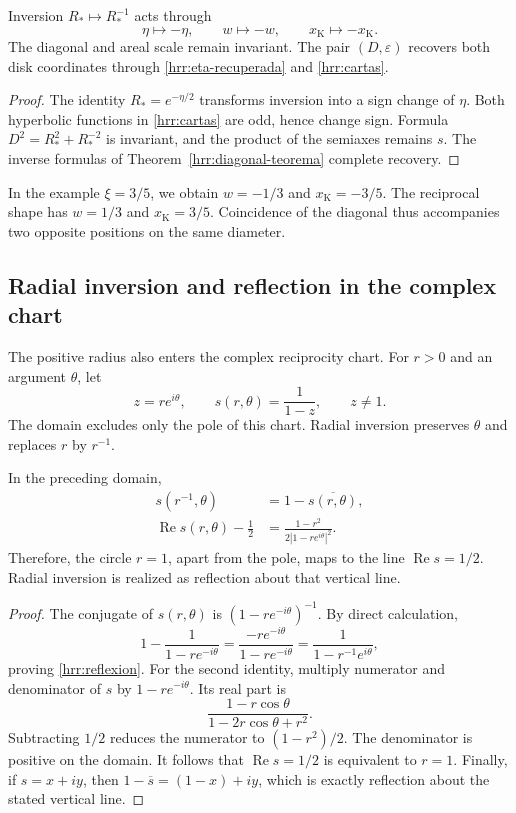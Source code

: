 \begin{proposition}
\label{hrr:reciprocidad-cartas} Inversion \(R_*\mapsto R_*^{-1}\) acts through
\[
 \eta\mapsto-\eta,\qquad w\mapsto-w,
 \qquad x_{\mathrm K}\mapsto-x_{\mathrm K}.
\]
The diagonal and areal scale remain invariant. The pair \((D,\varepsilon)\) recovers both disk coordinates through \eqref{hrr:eta-recuperada} and \eqref{hrr:cartas}.
\end{proposition}
\begin{proof}
The identity \(R_*=e^{-\eta/2}\) transforms inversion into a sign change of \(\eta\). Both hyperbolic functions in \eqref{hrr:cartas} are odd, hence change sign. Formula \(D^2=R_*^2+R_*^{-2}\) is invariant, and the product of the semiaxes remains \(s\). The inverse formulas of Theorem~\ref{hrr:diagonal-teorema} complete recovery.
\end{proof}

In the example \(\xi=3/5\), we obtain \(w=-1/3\) and \(x_{\mathrm K}=-3/5\). The reciprocal shape has \(w=1/3\) and \(x_{\mathrm K}=3/5\). Coincidence of the diagonal thus accompanies two opposite positions on the same diameter.

\subsection{Radial inversion and reflection in the complex chart}

The positive radius also enters the complex reciprocity chart. For \(r>0\) and an argument \(\theta\), let
\[
 z=re^{i\theta},\qquad s(r,\theta)=\frac1{1-z},
 \qquad z\neq1.
\]
The domain excludes only the pole of this chart. Radial inversion preserves \(\theta\) and replaces \(r\) by \(r^{-1}\).

\begin{proposition}
\label{hrr:reflexion-compleja} In the preceding domain,
\begin{align}
 s(r^{-1},\theta)&=1-\overline{s(r,\theta)},
 \label{hrr:reflexion}\\
 \operatorname{Re}s(r,\theta)-\frac12
 &=\frac{1-r^2}{2|1-re^{i\theta}|^2}.
 \label{hrr:reflexion-parte-real}
\end{align}
Therefore, the circle \(r=1\), apart from the pole, maps to the line \(\operatorname{Re}s=1/2\). Radial inversion is realized as reflection about that vertical line.
\end{proposition}
\begin{proof}
The conjugate of \(s(r,\theta)\) is \((1-re^{-i\theta})^{-1}\). By direct calculation,
\[
 1-\frac1{1-re^{-i\theta}}
 =\frac{-re^{-i\theta}}{1-re^{-i\theta}}
 =\frac1{1-r^{-1}e^{i\theta}},
\]
proving \eqref{hrr:reflexion}. For the second identity, multiply numerator and denominator of \(s\) by \(1-re^{-i\theta}\). Its real part is
\[
 \frac{1-r\cos\theta}{1-2r\cos\theta+r^2}.
\]
Subtracting \(1/2\) reduces the numerator to \((1-r^2)/2\). The denominator is positive on the domain. It follows that \(\operatorname{Re}s=1/2\) is equivalent to \(r=1\). Finally, if \(s=x+iy\), then \(1-\overline s=(1-x)+iy\), which is exactly reflection about the stated vertical line.
\end{proof}

